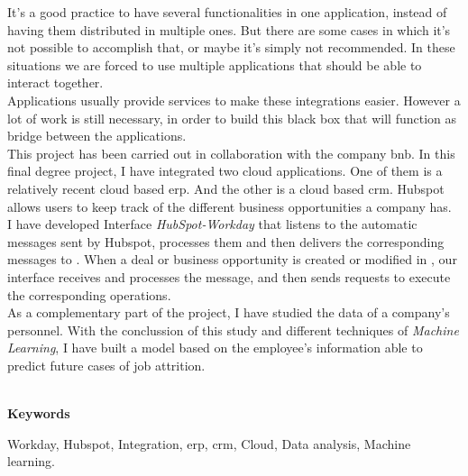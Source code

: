 	It's a good practice to have several functionalities in one application, instead of having them distributed in multiple ones. But there are some cases in which
	it’s not possible to accomplish that, or maybe it's simply not recommended. In these situations we are
	forced to use multiple applications that should be able to interact together.\\

	Applications usually provide services to make these integrations easier. However a lot of work is still necessary, in order to build this black box that will function as bridge between the applications.\\
	
	This project has been carried out in collaboration with the company \acrfull{bnb}. In this final degree project, I have integrated two cloud applications. One of
	them is \wday{} a relatively recent cloud based \acrshort{erp}. And the other is \hs{} a cloud based \acrshort{crm}.
	Hubspot allows users to keep track of the different business opportunities a company has.\\
	
	I have developed Interface \textit{HubSpot-Workday} that listens to the automatic messages sent by Hubspot,
	processes them and then delivers the corresponding messages to \wday{}. When a deal or business
	opportunity is created or modified in \hs{}, our interface receives and processes the message, and then sends \wday{} requests to execute the corresponding operations.\\

	As a complementary part of the project, I have studied the data of a company’s personnel. 
	With the conclussion of this study and different techniques of \textit{Machine Learning}, I have
	built a model based on the employee's information able to predict future cases of job attrition.\\

	
	
	
	\
	
	\textbf{Keywords}
    
    Workday, Hubspot, Integration, \acrfull{erp}, \acrfull{crm}, Cloud, Data analysis, Machine learning.
	
	
